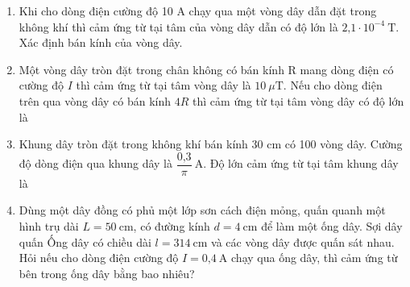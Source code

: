 \begin{enumerate}
	\item {Khi cho dòng điện cường độ 10 A chạy qua một vòng dây dẫn đặt trong không khí thì cảm ứng từ tại tâm của vòng dây dẫn có độ lớn là $\text{2,1}\cdot 10^{-4}\ \text{T}$. Xác định bán kính của vòng dây.
	}
	\item {Một vòng dây tròn đặt trong chân không có bán kính R mang dòng điện có cường độ $I$ thì cảm ứng từ tại tâm vòng dây là $10\ \mu \text{T}$. Nếu cho dòng điện trên qua vòng dây có bán kính $4R$ thì cảm ứng từ tại tâm vòng dây có độ lớn là
	}
	\item{Khung dây tròn đặt trong không khí bán kính 30 cm có 100 vòng dây. Cường độ dòng điện qua khung dây là $\dfrac{\text{0,3}}{\pi}\ \text{A}$. Độ lớn cảm ứng từ tại tâm khung dây là 
	}
	\item {Dùng một dây đồng có phủ một lớp sơn cách điện mỏng, quấn quanh một hình trụ dài $L = 50\ \text{cm}$, có đường kính $d = 4\ \text{cm}$ để làm một ống dây. Sợi dây quấn Ống dây có chiều dài $l = 314\ \text{cm}$ và các vòng dây được quấn sát nhau. Hỏi nếu cho dòng điện cường độ $I = \text{0,4}\ \text{A}$ chạy qua ống dây, thì cảm ứng từ bên trong ống dây bằng bao nhiêu?
		}
\end{enumerate}
